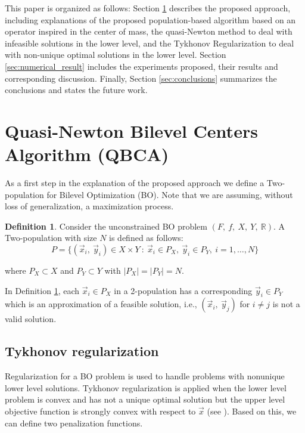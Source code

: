 \documentclass[conference]{IEEEtran}
\theoremstyle{definition}
\newtheorem{definition}{Definition}[section]
\begin{document}
This paper is organized as follows: Section \ref{sec:qca} describes the proposed
approach, including explanations of the proposed population-based algorithm based
on an operator inspired in the center of mass, the quasi-Newton method to deal
with infeasible solutions in the lower level, and the Tykhonov Regularization to
deal with non-unique optimal solutions in the lower level. Section \ref{sec:numerical_result}
includes the experiments proposed, their results and corresponding discussion.
Finally, Section \ref{sec:conclusions} summarizes the conclusions and states
the future work.





\section{Quasi-Newton Bilevel Centers Algorithm (QBCA)} %
\label{sec:qca}

As a first step in the explanation of the proposed approach we define a
Two-population for Bilevel Optimization (BO). Note that we are assuming, without
loss of generalization,  a maximization process.

\begin{definition}
    \label{def:pop2}
    Consider the unconstrained BO problem $(F, \ f, \ X, \ Y, \ \mathbb{R} )$. A
    Two-population with size $N$ is defined as follows:
    $$
        P = \{  (\vec{x}_i, \ \vec{y}_i) \in X \times Y \ : \
                \vec{x}_i \in P_X, \ \vec{y}_i \in P_Y, \ i=1,\ldots,N
            \}
    $$
     
     
    where $P_X \subset X$ and $P_Y \subset Y$ with $|P_X| = |P_Y| = N$.
\end{definition}
 
In Definition \ref{def:pop2}, each $\vec{x}_i \in P_X$ in a 2-population has a
corresponding $\vec{y}_i \in P_Y$ which is an approximation of a feasible solution,
i.e., $(\vec{x}_i, \ \vec{y}_j)$ for $i \neq j$ is  not a valid solution.
 

\subsection{Tykhonov regularization}
Regularization for a BO problem is used to handle problems with nonunique lower
level solutions.  Tykhonov regularization is applied when the lower level problem
is convex and has not a unique optimal solution but the upper level objective function
is strongly convex with respect to $\vec{x}$ (see \cite{dempe2002foundations}).
Based on this, we can define two penalization functions.
\end{document}
